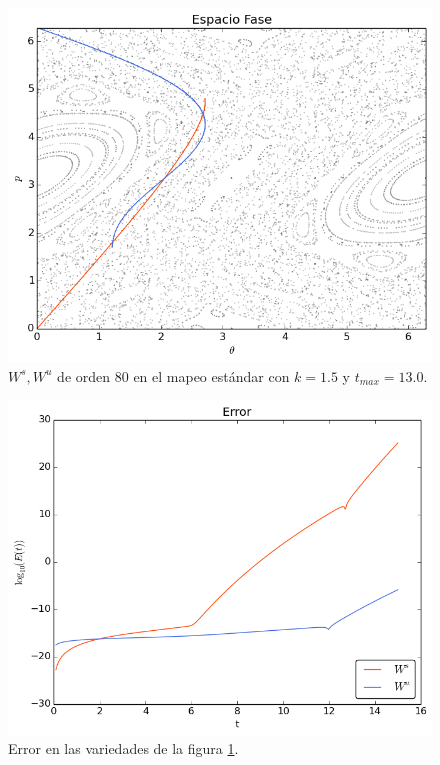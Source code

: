 \begin{figure}[H]
\centering
\includegraphics[scale=0.6]{estandark15}
\caption{$W^{s},W^{u}$ de orden $80$ en el mapeo estándar con $k=1.5$ y $t_{max}=13.0$.}
\label{estandar15}
\end{figure}

\begin{figure}[H]
\centering
\includegraphics[scale=0.6]{error_est_k15} 
\caption{Error en las variedades de la figura \ref{estandar15}.}
\label{error est k15}
\end{figure}




